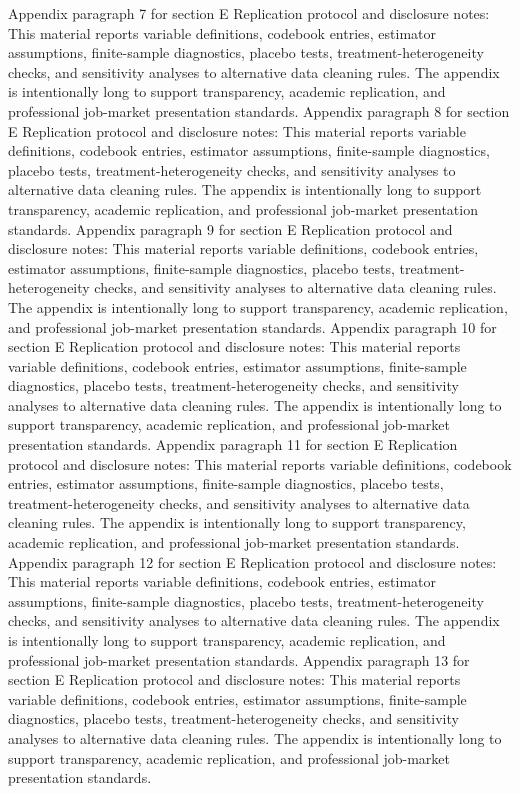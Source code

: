 \documentclass[preprint,12pt]{elsarticle}
\begin{document}
Appendix paragraph 7 for section E Replication protocol and disclosure notes: This material reports variable definitions, codebook entries, estimator assumptions, finite-sample diagnostics, placebo tests, treatment-heterogeneity checks, and sensitivity analyses to alternative data cleaning rules. The appendix is intentionally long to support transparency, academic replication, and professional job-market presentation standards.
Appendix paragraph 8 for section E Replication protocol and disclosure notes: This material reports variable definitions, codebook entries, estimator assumptions, finite-sample diagnostics, placebo tests, treatment-heterogeneity checks, and sensitivity analyses to alternative data cleaning rules. The appendix is intentionally long to support transparency, academic replication, and professional job-market presentation standards.
Appendix paragraph 9 for section E Replication protocol and disclosure notes: This material reports variable definitions, codebook entries, estimator assumptions, finite-sample diagnostics, placebo tests, treatment-heterogeneity checks, and sensitivity analyses to alternative data cleaning rules. The appendix is intentionally long to support transparency, academic replication, and professional job-market presentation standards.
Appendix paragraph 10 for section E Replication protocol and disclosure notes: This material reports variable definitions, codebook entries, estimator assumptions, finite-sample diagnostics, placebo tests, treatment-heterogeneity checks, and sensitivity analyses to alternative data cleaning rules. The appendix is intentionally long to support transparency, academic replication, and professional job-market presentation standards.
Appendix paragraph 11 for section E Replication protocol and disclosure notes: This material reports variable definitions, codebook entries, estimator assumptions, finite-sample diagnostics, placebo tests, treatment-heterogeneity checks, and sensitivity analyses to alternative data cleaning rules. The appendix is intentionally long to support transparency, academic replication, and professional job-market presentation standards.
Appendix paragraph 12 for section E Replication protocol and disclosure notes: This material reports variable definitions, codebook entries, estimator assumptions, finite-sample diagnostics, placebo tests, treatment-heterogeneity checks, and sensitivity analyses to alternative data cleaning rules. The appendix is intentionally long to support transparency, academic replication, and professional job-market presentation standards.
Appendix paragraph 13 for section E Replication protocol and disclosure notes: This material reports variable definitions, codebook entries, estimator assumptions, finite-sample diagnostics, placebo tests, treatment-heterogeneity checks, and sensitivity analyses to alternative data cleaning rules. The appendix is intentionally long to support transparency, academic replication, and professional job-market presentation standards.
\end{document}
